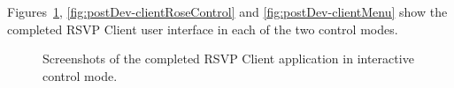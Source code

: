     Figures~\ref{fig:postDev-clientInteractiveControl}, \ref{fig:postDev-clientRoseControl} and \ref{fig:postDev-clientMenu} show the completed RSVP Client user interface in each of the two control modes.
  
    \begin{figure}[H]
      \centering
      \caption[Screenshots of the completed RSVP Client application in interactive control mode.]{Screenshots of the completed RSVP Client application in interactive control mode.}
      \label{fig:postDev-clientInteractiveControl}
    \end{figure}
  
